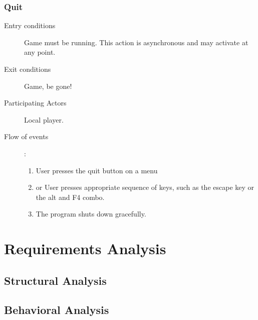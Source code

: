 \documentclass[12pt]{article}
\begin{document}
    \subsubsection{Quit}
    \begin{description}
        \item[Entry conditions] Game must be running. This action is
            asynchronous and may activate at any point.
        \item[Exit conditions] Game, be gone!
        \item[Participating Actors] Local player.
        \item[Flow of events]:
            \begin{enumerate}
                \item User presses the quit button on a menu
                \item or User presses appropriate sequence of keys, such as
                    the escape key or the alt and F4 combo.
                \item The program shuts down gracefully.
            \end{enumerate}
    \end{description}



\section{Requirements Analysis}

\subsection{Structural Analysis}\label{struct-analysis-BC}

\subsection{Behavioral Analysis}\label{behavioral-analysis-HR}
\end{document}
